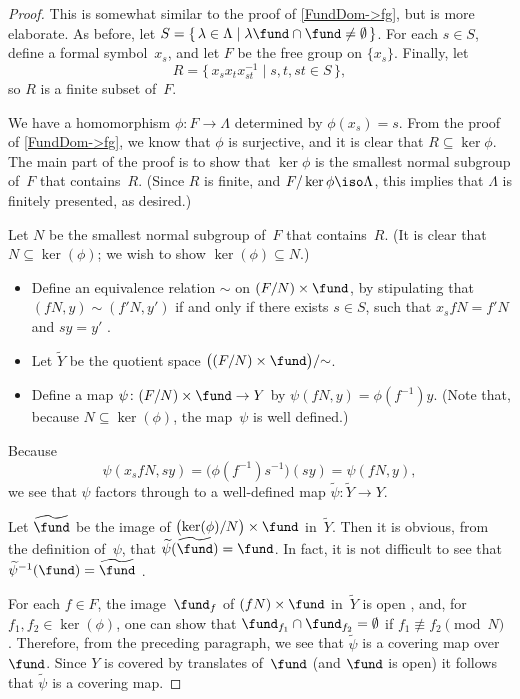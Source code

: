 \begin{proof}
 This is somewhat similar to the proof of \cref{FundDom->fg}, but is more elaborate.
 As before, let $S = \{\, \lambda
\in \Lambda \mid \lambda \fund \cap \fund \neq \emptyset
\,\}$. For each $s \in S$, define a formal symbol~$x_s$,
and let $F$ be the free group on $\{x_s\}$. Finally, let
	$$R = \{\, x_s x_t x_{st}^{-1} \mid s,t,st \in S \,\} ,$$
so $R$ is a finite subset of~$F$.

We have a homomorphism $\phi \colon F \to \Lambda$
determined by $\phi(x_s) = s$. From the proof of 
\cref{FundDom->fg}, we know that $\phi$ is
surjective, and it is clear that $R \subseteq \ker\phi$.
The main part of the proof is to show that $\ker \phi$ is
the smallest normal subgroup of~$F$ that contains~$R$.
(Since $R$ is finite, and $F/\ker \phi \iso \Lambda$, this
implies that $\Lambda$ is finitely presented, as desired.)

Let $N$ be the smallest normal subgroup of~$F$ that
contains~$R$. (It is clear that $N \subseteq \ker(\phi)$; we
wish to show $\ker(\phi) \subseteq N$.)
 \begin{itemize}
 
 \item Define an equivalence relation $\sim$ on $(F/N)
\times \fund$, by stipulating that
 $(f N, y) \sim (f' N , y')$
 if and only if there exists $s \in S$, such that $x_s fN =
f'N$ and $sy = y'$ . 

 \item Let $\widetilde{Y}$ be the quotient space $\bigl( (F/N) \times \fund \bigr) /
{\sim}$.

 \item Define a map $\psi \colon (F/N)
\times \fund \to Y$ by $\psi(fN,y) = \phi(f^{-1}) y$. (Note
that, because $N \subseteq \ker(\phi)$, the map~$\psi$ is
well defined.)
 \end{itemize}
 Because 
 $$\psi(x_s fN, sy) 
 = \bigl( \phi(f^{-1}) s^{-1} \bigr) (sy)
 = \psi(fN,y) ,$$
 we see that $\psi$ factors through to a
well-defined map $\widetilde \psi \colon \widetilde{Y} \to
Y$.

Let $\widetilde \fund$ be the image of $\bigl(\ker(\phi)/N
\bigr) \times \fund$ in~$\widetilde{Y}$. Then it is obvious,
from the definition of~$\psi$, that $\widetilde \psi(
\widetilde \fund) = \fund$. In fact, it is not difficult
to see that $\widetilde \psi^{-1}(\fund) = \widetilde
\fund$ .

For each $f \in F$, the image~$\fund_f$ of $(f N) \times
\fund$ in~$\widetilde{Y}$ is open , and,
for $f_1,f_2 \in \ker(\phi)$, one can show that
$\fund_{f_1} \cap \fund_{f_2} = \emptyset$ if $f_1
\not\equiv f_2 \pmod{N}$ . Therefore,
from the preceding paragraph, we see that $\widetilde \psi$
is a covering map over~$\fund$. Since $Y$ is covered by
translates of~$\fund$ (and $\fund$ is open) it follows that $\widetilde \psi$
is a covering map. 


\end{proof}
